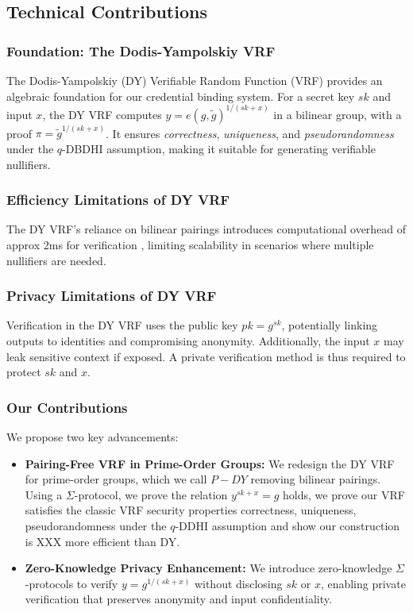 \subsection{Technical Contributions}

\subsubsection{Foundation: The Dodis-Yampolskiy VRF}
The Dodis-Yampolskiy (DY) Verifiable Random Function (VRF) \cite{hutchison_verifiable_2005} provides an algebraic foundation for our credential binding system. For a secret key $sk$ and input $x$, the DY VRF computes $y = e(g, \tilde{g})^{1/(sk + x)}$ in a bilinear group, with a proof $\pi = \tilde{g}^{1/(sk + x)}$. It ensures \emph{correctness}, \emph{uniqueness}, and \emph{pseudorandomness} under the $q$-DBDHI assumption, making it suitable for generating verifiable nullifiers.

\subsubsection{Efficiency Limitations of DY VRF}
The DY VRF’s reliance on bilinear pairings introduces computational overhead of approx 2ms for verification \cite{polgar_anonymous_2025}, limiting scalability in scenarios where multiple nullifiers are needed. 

\subsubsection{Privacy Limitations of DY VRF}
Verification in the DY VRF uses the public key $pk = g^{sk}$, potentially linking outputs to identities and compromising anonymity. Additionally, the input $x$ may leak sensitive context if exposed. A private verification method is thus required to protect $sk$ and $x$.

\subsubsection{Our Contributions}
We propose two key advancements:

\begin{itemize}
    \item \textbf{Pairing-Free VRF in Prime-Order Groups:} We redesign the DY VRF for prime-order groups, which we call $P{-}DY$ removing bilinear pairings. Using a $\Sigma$-protocol, we prove the relation $y^{sk + x} = g$ holds, we prove our VRF satisfies the classic VRF security properties  \cite{micali_verifiable_1999} correctness, uniqueness, pseudorandomness under the $q$-DDHI assumption and show our construction is XXX more efficient than DY. 
    
    \item \textbf{Zero-Knowledge Privacy Enhancement:} We introduce zero-knowledge $\Sigma$-protocols to verify $y = g^{1/(sk + x)}$ without disclosing $sk$ or $x$, enabling private verification that preserves anonymity and input confidentiality.
\end{itemize}

